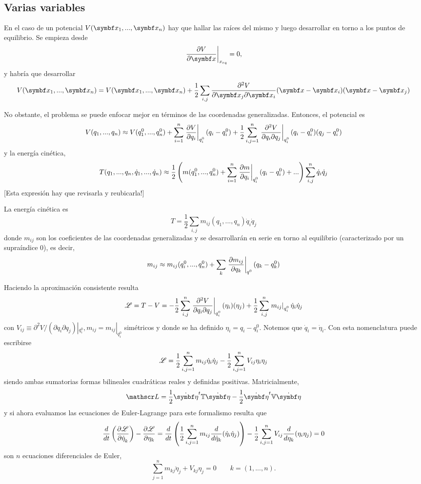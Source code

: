 \documentclass[10pt,oneside]{CBFT_book}
\begin{document}
\subsection{Varias variables}

En el caso de un potencial $V(\vb{x}_1, ...,\vb{x}_n)$ hay que hallar las raíces del mismo y luego desarrollar en torno a los puntos
de equilibrio. Se empieza desde 
\[
	\dpare{V}{\vb{x}}{x_{eq}} = 0,
\]
y habría que desarrollar 
\[
	V( \vb{x}_1, ...,\vb{x}_n ) = V( \vb{x}_1, ...,\vb{x}_n ) + 
	\frac 1 2 \sum_{i,j} \dparcru{V}{\vb{x}_i}{\vb{x}_j}(\vb{x}-\vb{x}_i)(\vb{x}-\vb{x}_j)
\]

No obstante, el problema se puede enfocar mejor en términos de las coordenadas generalizadas. Entonces, el potencial es
\[
	V(q_1,...,q_n) \approx V(q_1^0,...,q_n^0) + \sum_{i=1}^n \left. \dpar{V}{q_i} \right|_{q_i^0} (q_i - q_i^0)
		+ \frac{1}{2} \sum_{i,j=1}^n \left. \dparcru{V}{q_j}{q_i}\right|_{q_i^0}(q_i -q_i^0)(q_j -q_i^0)
\]
y la energía cinética,
\[
	T(q_1,...,q_n,\dot{q}_1,...,\dot{q}_n) \approx \frac{1}{2} \left( m(q_1^0,...,q_n^0) + \sum_{i=1}^n 
				\left. \dpar{m}{q_i} \right|_{q_i^0} (q_i - q_i^0) + ... \right) \sum_{i,j}^n \dot{q}_i\dot{q}_j
\]
[Esta expresión hay que revisarla y reubicarla!]

La energía cinética es 
\[
	T = \frac 1 2 \sum_{i,j} m_{ij}(q_1,...,q_n) \dot{q}_i \dot{q}_j
\]
donde $m_{ij}$ son los coeficientes de las coordenadas generalizadas y se desarrollarán en serie en torno al equilibrio (caracterizado
por un supraíndice $0$), es decir,
\[
	m_{ij} \approx m_{ij}( q_i^0, ..., q_n^0 ) + \sum_k \dpare{ m_{ij} }{ q_k }{q^0}( q_k - q_k^0 )
\]


Haciendo la aproximación consistente resulta 
\[
	\Lag = T - V = - \frac{1}{2} \sum_{i,j}^n \left. \dparcru{V}{q_j}{q_i}\right|_{q_i^0}(\eta_i)(\eta_j) +
		\frac{1}{2} \sum_{i,j}^n \left. m_{ij}\right|_{q_i^0} \dot{\eta}_i \dot{\eta}_j
\]
con $V_{ij} \equiv \partial^2 V / ( \partial q_i \partial q_j ) |_{q_i^0}, m_{ij} = m_{ij}|_{q_i^0}$ simétricos 
y donde se ha definido $\eta_i = q_i - q_i^0$. Notemos que $\dot{q}_i = \dot{\eta}_i $.
Con esta nomenclatura puede escribirse
\[
	\Lag = \frac{1}{2} \sum_{i,j=1}^n m_{ij} \dot{\eta}_i \dot{\eta}_j - \frac{1}{2} \sum_{i,j=1}^n V_{ij} \eta_i \eta_j
\]
siendo ambas sumatorias formas bilineales cuadráticas reales y definidas positivas. Matricialmente,
\[
	\Lag = \frac{1}{2} \dot{\vb{\eta}}^t \mathbb{T} \dot{\vb{\eta}} - \frac{1}{2} \dot{\vb{\eta}}^t \mathbb{V} \dot{\vb{\eta}}
\]
y si ahora evaluamos las ecuaciones de Euler-Lagrange para este formalismo resulta que 
\[
	\frac{d}{dt}\left( \dpar{\Lag}{\dot{\eta}_k} \right) - \dpar{\Lag}{\eta_k} = 
		\frac{d}{dt} \left( \frac{1}{2} \sum_{i,j=1}^n m_{ij} \frac{d}{d\dot{\eta}_k}(\dot{\eta}_i \dot{\eta}_j) \right) - 
		\frac{1}{2} \sum_{i,j=1}^n V_{ij} \frac{d}{d\eta_k} (\eta_i \eta_j) = 0
\]
son $n$ ecuaciones diferenciales de Euler, 
\[
	\sum_{j=1}^n m_{kj} \ddot{\eta}_j + V_{kj} \eta_j = 0 \qquad k=(1,...,n).
\]
\end{document}
